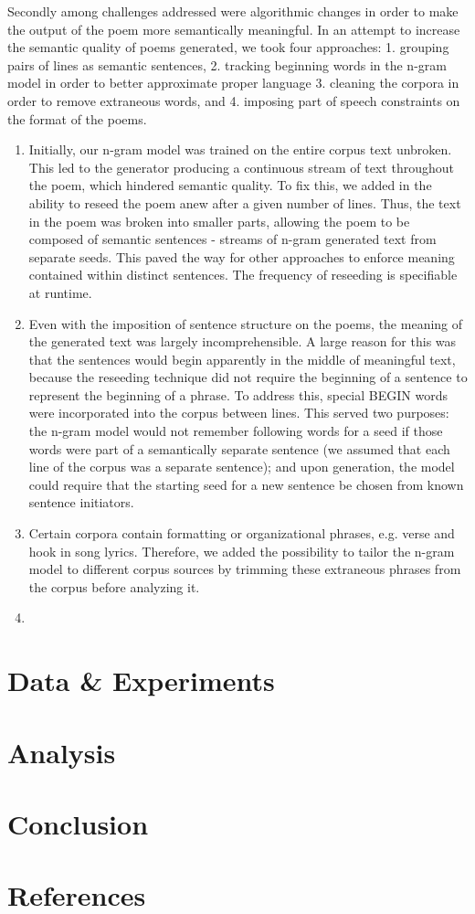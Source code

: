 \documentclass[10pt,twocolumn]{article}
\begin{document}
Secondly among challenges addressed were algorithmic changes in order to make the output of the poem more semantically meaningful. In an attempt to increase the semantic quality of poems generated, we took four approaches: 1. grouping pairs of lines as semantic sentences, 2. tracking beginning words in the n-gram model in order to better approximate proper language  3. cleaning the corpora in order to remove extraneous words, and 4. imposing part of speech constraints on the format of the poems.
\begin{enumerate}
\item Initially, our n-gram model was trained on the entire corpus text unbroken. This led to the generator producing a continuous stream of text throughout the poem, which hindered semantic quality. To fix this, we added in the ability to reseed the poem anew after a given number of lines. Thus, the text in the poem was broken into smaller parts, allowing the poem to be composed of semantic sentences - streams of n-gram generated text from separate seeds. This paved the way for other approaches to enforce meaning contained within distinct sentences. The frequency of reseeding is specifiable at runtime. 

\item Even with the imposition of sentence structure on the poems, the meaning of the generated text was largely incomprehensible. A large reason for this was that the sentences would begin apparently in the middle of meaningful text, because the reseeding technique did not require the beginning of a sentence to represent the beginning of a phrase. To address this, special BEGIN words were incorporated into the corpus between lines. This served two purposes: the n-gram model would not remember following words for a seed if those words were part of a semantically separate sentence (we assumed that each line of the corpus was a separate sentence); and upon generation, the model could require that the starting seed for a new sentence be chosen from known sentence initiators.

\item Certain corpora contain formatting or organizational phrases, e.g. verse and hook in song lyrics. Therefore, we added the possibility to tailor the n-gram model to different corpus sources by trimming these extraneous phrases from the corpus before analyzing it.
\item
\end{enumerate}




\section{Data \& Experiments}

\section {Analysis}

\section{Conclusion}

\section{References}
\end{document}
